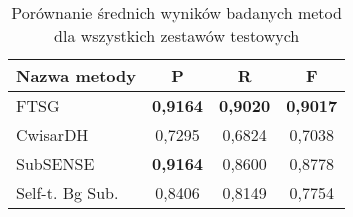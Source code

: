 \begin{table}[!h]
\small
\caption{Porównanie średnich wyników badanych metod dla wszystkich zestawów testowych}
\label{tab:resultsAll}
\centering
\begin{tabular}{|p{4cm}*{3}{|c}|}
  \hline 
  \textbf{Nazwa metody} & \textbf{P} & \textbf{R} & \textbf{F}\\
  \hline
  FTSG & \textbf{0,9164} & \textbf{0,9020} & \textbf{0,9017} \\
\hline
CwisarDH & 0,7295 & 0,6824 & 0,7038 \\
\hline
SubSENSE & \textbf{0,9164} & 0,8600 & 0,8778 \\
\hline
Self-t. Bg Sub. & 0,8406 & 0,8149 & 0,7754 \\
\hline
\end{tabular}
\end{table}
\FloatBarrier